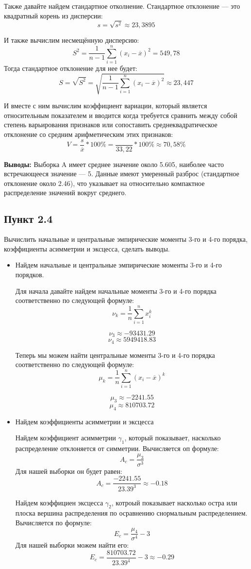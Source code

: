 \documentclass[12pt]{article}
\begin{document}
Также давайте найдем стандартное отколнение. Стандартное отклонение — это квадратный корень из дисперсии:\\
$$ s = \sqrt{s^2} \approx 23,3895 $$

И также вычислим несмещённую дисперсию:
$$ S^2 = \frac{1}{n-1} \sum_{i=1}^n (x_i - \overline{x})^2 = 549,78$$
Тогда стандартное отклонение для нее будет:
$$ S = \sqrt{S^2} = \sqrt{\frac{1}{n-1} \sum_{i=1}^n (x_i - \overline{x})^2} \approx 23,447 $$

И вместе с ним вычислим коэффициент вариации, который является относительным показателем и вводится когда требуется сравнить между собой степень варьирования признаков или сопоставить среднеквадратическое отклонение со средним арифметическим этих признаков:
$$ V = \frac{s}{\overline{x}} * 100\% = \frac{}{33,22} * 100\% \approx 70,58\% $$

\textbf{Выводы:} Выборка A имеет среднее значение около 5.605, наиболее часто встречающееся значение — 5. Данные имеют умеренный разброс (стандартное отклонение около 2.46), что указывает на относительно компактное распределение значений вокруг среднего.


\subsection*{Пункт 2.4}
Вычислить начальные и центральные эмпирические моменты 3-го и 4-го порядка, коэффициенты асимметрии и эксцесса, сделать выводы.
\begin{itemize}
\item Найдем начальные и центральные эмпирические моменты 3-го и 4-го порядков.

Для начала давайте найдем начальные моменты 3-го и 4-го порядка соответственно по следующей формуле:\\
$$ \nu_k = \frac{1}{n} \sum_{i=1} ^ n x_i ^k$$

$$ \nu_3 \approx -93431.29 $$
$$ \nu_4 \approx 5949418.83 $$

Теперь мы можем найти центральные моменты 3-го и 4-го порядка соответственно по следующей формуле:\\
$$ \mu_k = \frac{1}{n} \sum_{i=1} ^ n {(x_i - \overline{x})^k} $$

$$ \mu_3 \approx -2241.55 $$
$$ \mu_4 \approx 810703.72 $$

\item Найдем коэффициенты асимметрии и эксцесса

Найдем коэффициент асимметрии $\gamma_1$, который показывает, насколько распределение отклоняется от симметрии. Вычисляется оп формуле:\\
$$ A_c = \frac{\mu_3}{\sigma^3} $$
Для нашей выборки он будет равен:
$$ A_c = \frac{-2241.55}{23.39^3} \approx -0.18$$

Найдем коэффициен эксцесса $\gamma_2$, котроый показывает насколько остра или плоска вершина распределения по осравнению снормальным распределением. Вычисляется по формуле:\\
$$ E_c = \frac{\mu_4}{\sigma^4} - 3 $$
Для нашей выборки можем найти его:\\
$$ E_c = \frac{810703.72}{23.39^4} - 3 \approx -0.29 $$

\end{itemize}
\end{document}
